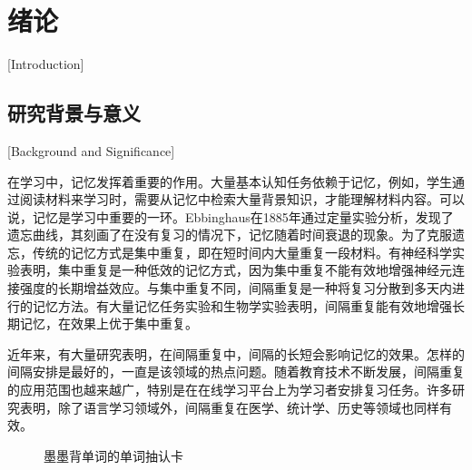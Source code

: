 
\chapter{绪论}[Introduction]

\section{研究背景与意义}[Background and Significance]

在学习中，记忆发挥着重要的作用。大量基本认知任务依赖于记忆，例如，学生通过阅读材料来学习时，需要从记忆中检索大量背景知识，才能理解材料内容\cite{reisbergCognitionExploringScience2019}。可以说，记忆是学习中重要的一环。Ebbinghaus在1885年通过定量实验分析，发现了遗忘曲线，其刻画了在没有复习的情况下，记忆随着时间衰退的现象\cite{ebbinghausMemoryContributionExperimental1913}。为了克服遗忘，传统的记忆方式是集中重复，即在短时间内大量重复一段材料。有神经科学实验表明，集中重复是一种低效的记忆方式，因为集中重复不能有效地增强神经元连接强度的长期增益效应\cite{kramarSynapticEvidenceEfficacy2012}。与集中重复不同，间隔重复是一种将复习分散到多天内进行的记忆方法。有大量记忆任务实验\cite{cepedaDistributedPracticeVerbal2006}和生物学实验\cite{smolenRightTimeLearn2016}表明，间隔重复能有效地增强长期记忆，在效果上优于集中重复。

近年来，有大量研究表明，在间隔重复中，间隔的长短会影响记忆的效果\cite{cepedaSpacingEffectsLearning2008,delaneySpacingTestingEffects2010}。怎样的间隔安排是最好的，一直是该领域的热点问题。随着教育技术不断发展，间隔重复的应用范围也越来越广，特别是在在线学习平台上为学习者安排复习任务。许多研究表明，除了语言学习\cite{bahrickRetentionSpanishVocabulary1987}领域外，间隔重复在医学\cite{tjImpactOnlineEducation2012}、统计学\cite{maassHowSpacingVariable2015}、历史\cite{carpenterUsingTestsEnhance2009}等领域也同样有效。


\begin{figure}[htb]
    \setlength{\subfigcapskip}{-1bp}
    \centering
    \begin{minipage}{\textwidth}
    \centering
    \subfigure{\label{fig:flashcard:front}}\addtocounter{subfigure}{-2}
    \hspace{2em}
    \subfigure{\label{fig:flashcard:back}}\addtocounter{subfigure}{-2}
    \end{minipage}
    \vspace{0.2em}
    \caption{墨墨背单词的单词抽认卡}
    \label{fig:flashcard}
\end{figure}


